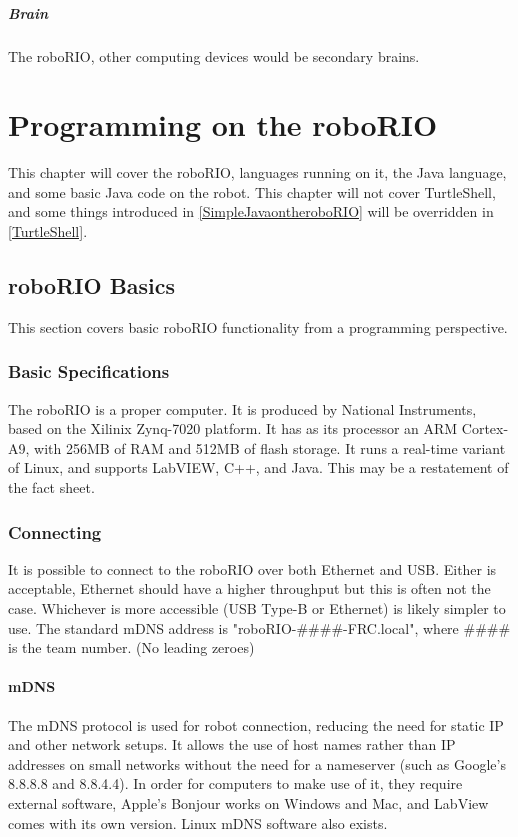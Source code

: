 \documentclass[]{report}
\begin{document}
\paragraph{Brain}
The roboRIO, other computing devices would be secondary brains.



\chapter{Programming on the roboRIO}
This chapter will cover the roboRIO, languages running on it, the Java language,
and some basic Java code on the robot.
This chapter will not cover TurtleShell, and some things introduced in \ref{SimpleJavaontheroboRIO} will be overridden in \ref{TurtleShell}.


\section{roboRIO Basics}
This section covers basic roboRIO functionality from a programming perspective.

\subsection{Basic Specifications}
The roboRIO is a proper computer.
It is produced by National Instruments, based on the Xilinix\goodcopyright{} Zynq\trademark{}-7020 platform.
It has as its processor an ARM Cortex\trademark{}-A9, with 256MB of RAM and 512MB of flash storage.
It runs a real-time variant of Linux, and supports LabVIEW, C++, and Java.
This may be a restatement of the fact sheet.

\subsection{Connecting}
It is possible to connect to the roboRIO over both Ethernet and USB.
Either is acceptable, Ethernet should have a higher throughput but this is often not the case.
Whichever is more accessible (USB Type-B or Ethernet) is likely simpler to use.
The standard mDNS address is "roboRIO-\#\#\#\#-FRC.local", where \#\#\#\# is the team number. (No leading zeroes)

\subsubsection{mDNS}
The mDNS protocol is used for robot connection, reducing the need for static IP and other network setups.
It allows the use of host names rather than IP addresses on small networks without the need for a nameserver (such as Google's 8.8.8.8 and 8.8.4.4).
In order for computers to make use of it, they require external software, Apple's Bonjour works on Windows and Mac, and LabView comes with its own version.
Linux mDNS software also exists.
\end{document}
